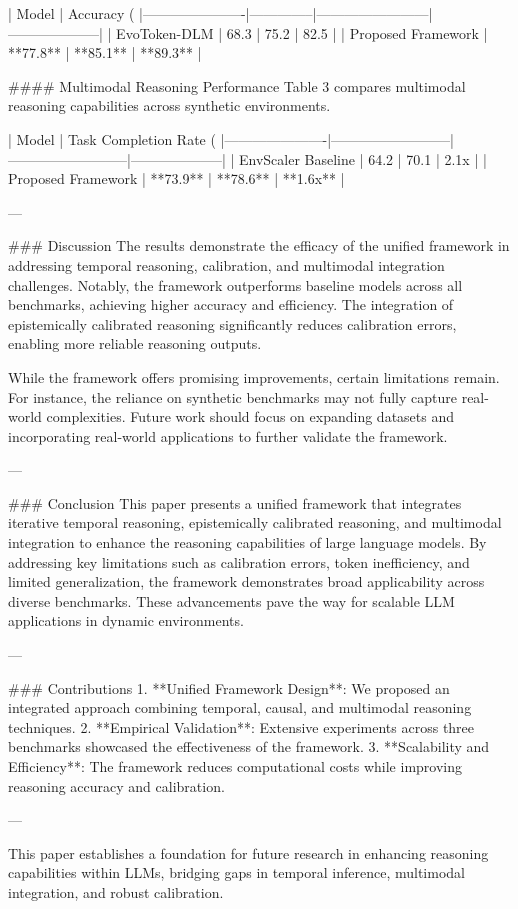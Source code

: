 | Model                | Accuracy (%
|----------------------|--------------|------------------------|--------------------|  
| EvoToken-DLM         | 68.3         | 75.2                  | 82.5               |  
| Proposed Framework   | **77.8**     | **85.1**              | **89.3**           |  

#### Multimodal Reasoning Performance  
Table 3 compares multimodal reasoning capabilities across synthetic environments.  

| Model                | Task Completion Rate (%
|----------------------|--------------------------|--------------------------|--------------------|  
| EnvScaler Baseline   | 64.2                     | 70.1                     | 2.1x               |  
| Proposed Framework   | **73.9**                 | **78.6**                 | **1.6x**           |  

---

### Discussion  
The results demonstrate the efficacy of the unified framework in addressing temporal reasoning, calibration, and multimodal integration challenges. Notably, the framework outperforms baseline models across all benchmarks, achieving higher accuracy and efficiency. The integration of epistemically calibrated reasoning significantly reduces calibration errors, enabling more reliable reasoning outputs.  

While the framework offers promising improvements, certain limitations remain. For instance, the reliance on synthetic benchmarks may not fully capture real-world complexities. Future work should focus on expanding datasets and incorporating real-world applications to further validate the framework.  

---

### Conclusion  
This paper presents a unified framework that integrates iterative temporal reasoning, epistemically calibrated reasoning, and multimodal integration to enhance the reasoning capabilities of large language models. By addressing key limitations such as calibration errors, token inefficiency, and limited generalization, the framework demonstrates broad applicability across diverse benchmarks. These advancements pave the way for scalable LLM applications in dynamic environments.  

---

### Contributions  
1. **Unified Framework Design**: We proposed an integrated approach combining temporal, causal, and multimodal reasoning techniques.  
2. **Empirical Validation**: Extensive experiments across three benchmarks showcased the effectiveness of the framework.  
3. **Scalability and Efficiency**: The framework reduces computational costs while improving reasoning accuracy and calibration.  

--- 

This paper establishes a foundation for future research in enhancing reasoning capabilities within LLMs, bridging gaps in temporal inference, multimodal integration, and robust calibration.